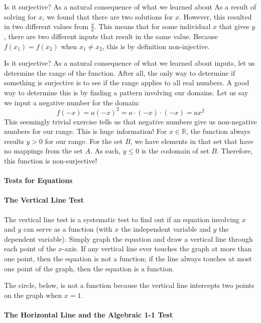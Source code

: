 Is it surjective? As a natural consequence of what we learned about As a result of solving for $x$, we found that there are two solutions for $x$. However, this resulted in two different values from $\frac{y}{a}$. This means that for some individual $x$ that gives $y$, there are two different inputs that result in the same value. Because $f(x_1) = f(x_2)$ when $x_1 \neq x_2$, this is by definition non-injective.

Is it surjective? As a natural consequence of what we learned about inputs, let us determine the range of the function. After all, the only way to determine if something is surjective is to see if the range applies to all real numbers. A good way to determine this is by finding a pattern involving our domains. Let us say we input a negative number for the domain:
$$
f(-x) = a(-x)^2 = a \cdot (-x) \cdot (-x) = ax^2
$$
This seemingly trivial exercise tells us that negative numbers give us non-negative numbers for our range. This is huge information! For $x \in \mathbb{R}$, the function always results $y > 0$ for our range. For the set $B$, we have elements in that set that have no mappings from the set $A$. As such, $y \leq 0$ is the codomain of set $B$. Therefore, this function is non-surjective!

\paragraph{Tests for Equations}

\paragraph{The Vertical Line Test}

The vertical line test is a systematic test to find out if an equation involving $x$ and $y$ can serve as a function (with $x$ the independent variable and $y$ the dependent variable). Simply graph the equation and draw a vertical line through each point of the $x$-axis. If any vertical line ever touches the graph at more than one point, then the equation is not a function; if the line always touches at most one point of the graph, then the equation is a function.

The circle, below, is not a function because the vertical line intercepts two points on the graph when $x = 1$.


\paragraph{The Horizontal Line and the Algebraic 1-1 Test}

